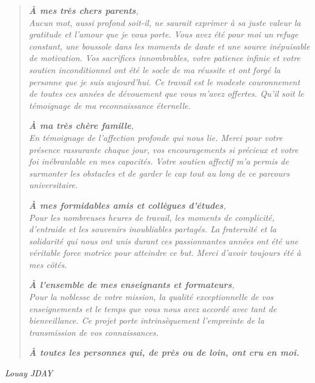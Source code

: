 \thispagestyle{empty}

\vspace*{1.5cm}

\begin{quote}
\large\itshape\color{black!90}
\textbf{À mes très chers parents},\\[6pt]
\normalsize\normalfont
Aucun mot, aussi profond soit-il, ne saurait exprimer à sa juste valeur la gratitude et l'amour que je vous porte. Vous avez été pour moi un refuge constant, une boussole dans les moments de doute et une source inépuisable de motivation. Vos sacrifices innombrables, votre patience infinie et votre soutien inconditionnel ont été le socle de ma réussite et ont forgé la personne que je suis aujourd'hui. Ce travail est le modeste couronnement de toutes ces années de dévouement que vous m'avez offertes. Qu'il soit le témoignage de ma reconnaissance éternelle.

\vspace{18pt}
\large\itshape
\textbf{À ma très chère famille},\\[6pt]
\normalsize\normalfont
En témoignage de l'affection profonde qui nous lie. Merci pour votre présence rassurante chaque jour, vos encouragements si précieux et votre foi inébranlable en mes capacités. Votre soutien affectif m'a permis de surmonter les obstacles et de garder le cap tout au long de ce parcours universitaire.

\vspace{18pt}
\large\itshape
\textbf{À mes formidables amis et collègues d'études},\\[6pt]
\normalsize\normalfont
Pour les nombreuses heures de travail, les moments de complicité, d'entraide et les souvenirs inoubliables partagés. La fraternité et la solidarité qui nous ont unis durant ces passionnantes années ont été une véritable force motrice pour atteindre ce but. Merci d'avoir toujours été à mes côtés.

\vspace{18pt}
\large\itshape
\textbf{À l'ensemble de mes enseignants et formateurs},\\[6pt]
\normalsize\normalfont
Pour la noblesse de votre mission, la qualité exceptionnelle de vos enseignements et le temps que vous nous avez accordé avec tant de bienveillance. Ce projet porte intrinsèquement l'empreinte de la transmission de vos connaissances.

\vspace{24pt}
\begin{center}
\large\itshape
\textbf{À toutes les personnes qui, de près ou de loin, ont cru en moi.}
\end{center}
\end{quote}

\vfill
\begin{flushright}
  \Large\textit{Louay JDAY}
\end{flushright}
\cleardoublepage
